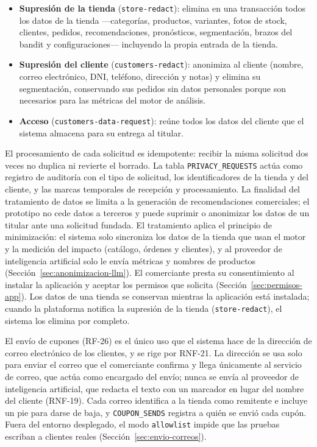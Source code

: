 \begin{itemize}
    \item \textbf{Supresión de la tienda} (\texttt{store-redact}): elimina en una transacción todos los datos de la tienda ---categorías, productos, variantes, fotos de stock, clientes, pedidos, recomendaciones, pronósticos, segmentación, brazos del bandit y configuraciones--- incluyendo la propia entrada de la tienda.
    \item \textbf{Supresión del cliente} (\texttt{customers-redact}): anonimiza al cliente (nombre, correo electrónico, DNI, teléfono, dirección y notas) y elimina su segmentación, conservando sus pedidos sin datos personales porque son necesarios para las métricas del motor de análisis.
    \item \textbf{Acceso} (\texttt{customers-data-request}): reúne todos los datos del cliente que el sistema almacena para su entrega al titular.
\end{itemize}

El procesamiento de cada solicitud es idempotente: recibir la misma solicitud dos veces no duplica ni revierte el borrado. La tabla \texttt{PRIVACY\_REQUESTS} actúa como registro de auditoría con el tipo de solicitud, los identificadores de la tienda y del cliente, y las marcas temporales de recepción y procesamiento. La finalidad del tratamiento de datos se limita a la generación de recomendaciones comerciales; el prototipo no cede datos a terceros y puede suprimir o anonimizar los datos de un titular ante una solicitud fundada. El tratamiento aplica el principio de minimización: el sistema solo sincroniza los datos de la tienda que usan el motor y la medición del impacto (catálogo, órdenes y clientes), y al proveedor de inteligencia artificial solo le envía métricas y nombres de productos (Sección~\ref{sec:anonimizacion-llm}). El comerciante presta su consentimiento al instalar la aplicación y aceptar los permisos que solicita (Sección~\ref{sec:permisos-app}). Los datos de una tienda se conservan mientras la aplicación está instalada; cuando la plataforma notifica la supresión de la tienda (\texttt{store-redact}), el sistema los elimina por completo.

El envío de cupones (RF-26) es el único uso que el sistema hace de la dirección de correo electrónico de los clientes, y se rige por RNF-21. La dirección se usa solo para enviar el correo que el comerciante confirma y llega únicamente al servicio de correo, que actúa como encargado del envío; nunca se envía al proveedor de inteligencia artificial, que redacta el texto con un marcador en lugar del nombre del cliente (RNF-19). Cada correo identifica a la tienda como remitente e incluye un pie para darse de baja, y \texttt{COUPON\_SENDS} registra a quién se envió cada cupón. Fuera del entorno desplegado, el modo \texttt{allowlist} impide que las pruebas escriban a clientes reales (Sección~\ref{sec:envio-correos}).

